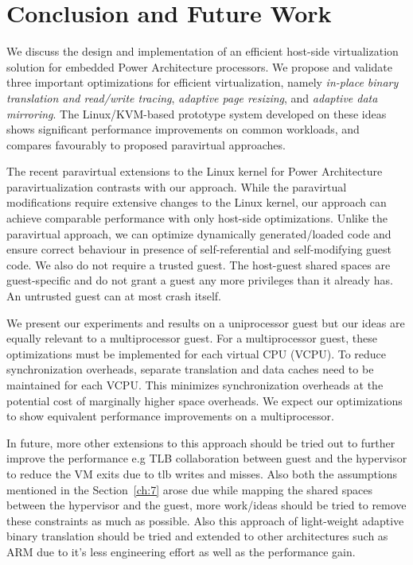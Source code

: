 \chapter{Conclusion and Future Work}\label{ch:8}
We discuss the design and implementation of an efficient host-side virtualization
solution
for embedded Power Architecture processors. We propose and validate three important optimizations for efficient virtualization, namely {\em in-place binary translation and read/write tracing}, {\em adaptive page resizing}, and {\em adaptive data mirroring}. The Linux/KVM-based prototype system developed on these ideas shows significant performance improvements on common workloads, and compares favourably to proposed paravirtual approaches.

The recent paravirtual extensions to the Linux kernel for Power Architecture paravirtualization contrasts with our approach. While the paravirtual modifications require extensive changes to the Linux kernel, our approach can achieve comparable performance with only host-side optimizations. Unlike the paravirtual approach, we can optimize dynamically generated/loaded code and ensure correct behaviour in presence of self-referential and self-modifying guest code. We also do not require a trusted guest. The host-guest shared spaces are guest-specific and do not grant a guest any more privileges than it already has. An untrusted guest can at most crash itself.

We present our experiments and results on a uniprocessor guest but our ideas are equally relevant to a multiprocessor guest. For a multiprocessor guest, these optimizations must be implemented for each virtual CPU (VCPU). To reduce synchronization overheads, separate translation and data caches need to be maintained for each VCPU. This minimizes synchronization overheads at the potential cost of marginally higher space overheads. We expect our optimizations to show equivalent performance improvements on a multiprocessor.

In future, more other extensions to this approach should be tried out to further improve the performance e.g TLB collaboration between guest and the hypervisor to reduce the VM exits due to tlb writes and misses. Also both the assumptions mentioned in the Section~\ref{ch:7} arose due while mapping the shared spaces between the hypervisor and the guest, more work/ideas should be tried to remove these constraints as much as possible. Also this approach of light-weight adaptive binary translation should be tried and extended to other architectures such as ARM due to it's less engineering effort as well as the performance gain.



